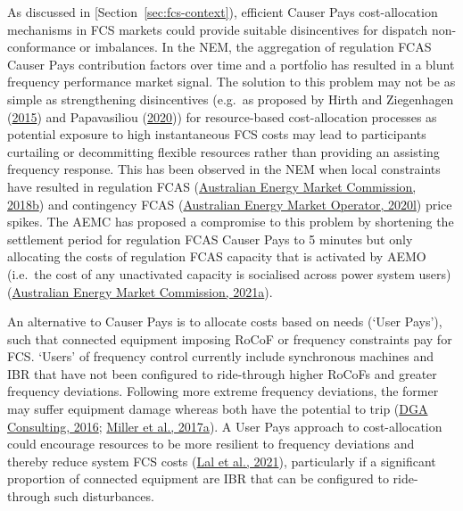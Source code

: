 \documentclass[12pt,a4paper,]{report}
\begin{document}
As discussed in {[}Section~\ref{sec:fcs-context}), efficient Causer Pays
cost-allocation mechanisms in FCS markets could provide suitable
disincentives for dispatch non-conformance or imbalances. In the NEM,
the aggregation of regulation FCAS Causer Pays contribution factors over
time and a portfolio has resulted in a blunt frequency performance
market signal. The solution to this problem may not be as simple as
strengthening disincentives (e.g.~as proposed by Hirth and Ziegenhagen
(\protect\hyperlink{ref-hirthBalancingPowerVariable2015}{2015}) and
Papavasiliou
(\protect\hyperlink{ref-papavasiliouScarcityPricingMissing2020}{2020}))
for resource-based cost-allocation processes as potential exposure to
high instantaneous FCS costs may lead to participants curtailing or
decommitting flexible resources rather than providing an assisting
frequency response. This has been observed in the NEM when local
constraints have resulted in regulation FCAS
(\protect\hyperlink{ref-australianenergymarketcommissionFrequencyControlFrameworks2018}{Australian
Energy Market Commission, 2018b}) and contingency FCAS
(\protect\hyperlink{ref-australianenergymarketoperatorQuarterlyEnergyDynamics2020}{Australian
Energy Market Operator, 2020l}) price spikes. The AEMC has proposed a
compromise to this problem by shortening the settlement period for
regulation FCAS Causer Pays to 5 minutes but only allocating the costs
of regulation FCAS capacity that is activated by AEMO (i.e.~the cost of
any unactivated capacity is socialised across power system users)
(\protect\hyperlink{ref-australianenergymarketcommissionPrimaryFrequencyResponse2021}{Australian
Energy Market Commission, 2021a}).

An alternative to Causer Pays is to allocate costs based on needs (`User
Pays'), such that connected equipment imposing RoCoF or frequency
constraints pay for FCS. `Users' of frequency control currently include
synchronous machines and IBR that have not been configured to
ride-through higher RoCoFs and greater frequency deviations. Following
more extreme frequency deviations, the former may suffer equipment
damage whereas both have the potential to trip
(\protect\hyperlink{ref-dgaconsultingInternationalReviewFrequency2016}{DGA
Consulting, 2016};
\protect\hyperlink{ref-millerAdvisoryEquipmentLimits2017}{Miller et al.,
2017a}). A User Pays approach to cost-allocation could encourage
resources to be more resilient to frequency deviations and thereby
reduce system FCS costs
(\protect\hyperlink{ref-lalEssentialSystemServices2021}{Lal et al.,
2021}), particularly if a significant proportion of connected equipment
are IBR that can be configured to ride-through such disturbances.
\end{document}
